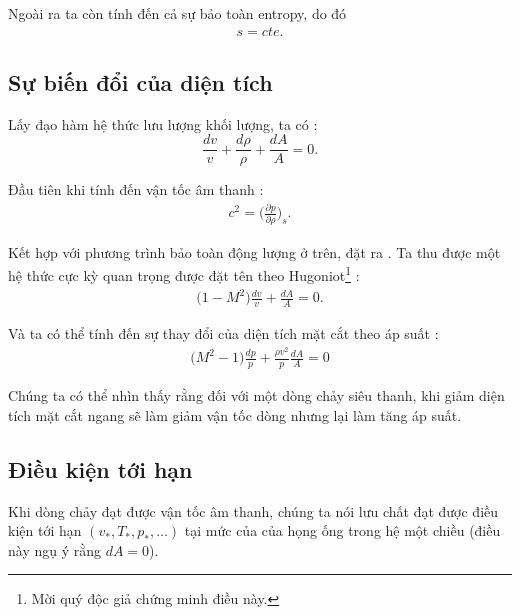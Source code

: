 \documentclass[DONG_CHAY_NEN_DUOC.tex]{subfiles}
\begin{document}
Ngoài ra ta còn tính đến cả sự bảo toàn entropy, do đó
\begin{equation}
	\begin{aligned}
 		s = cte.
	\end{aligned}
\end{equation}
\subsection{Sự biến đổi của diện tích}
Lấy đạo hàm hệ thức lưu lượng khối lượng, ta có :
$$
 	\frac{dv}{v}+\frac{d\rho}{\rho}+\frac{dA}{A}=0.
$$

Đầu tiên khi tính đến vận tốc âm thanh :
\begin{equation}
	\begin{aligned}
 		\boxed{
 			c^2 = \Bigg( \frac{\partial p}{\partial \rho}\Bigg)_s
 		}.
	\end{aligned}
\end{equation}

Kết hợp với phương trình bảo toàn động lượng ở trên, đặt ra . Ta thu được một hệ thức cực kỳ quan trọng được đặt tên theo Hugoniot\footnote{Mời quý độc giả chứng minh điều này.} :
\begin{equation}
	\begin{aligned}
 		\boxed{
 			\Big(1-M^2\Big)\frac{dv}{v} + \frac{dA}{A} = 0
 		}.
	\end{aligned}
\end{equation}

Và ta có thể tính đến sự thay đổi của diện tích mặt cắt theo áp suất :
\begin{equation}
	\begin{aligned}
 		\Big(M^2-1\Big)\frac{dp}{p} + \frac{\rho v^2}{p}\frac{dA}{A} = 0
	\end{aligned}
\end{equation}

Chúng ta có thể nhìn thấy rằng đối với một dòng chảy siêu thanh, khi giảm diện tích mặt cắt ngang sẽ làm giảm vận tốc dòng nhưng lại làm tăng áp suất.

\subsection{Điều kiện tới hạn}

Khi dòng chảy đạt được vận tốc âm thanh, chúng ta nói lưu chất đạt được điều kiện tới hạn $(v_*, T_*, p_*,\dots)$ tại mức của của họng ống trong hệ một chiều (điều này ngụ ý rằng $dA = 0$).
\end{document}
